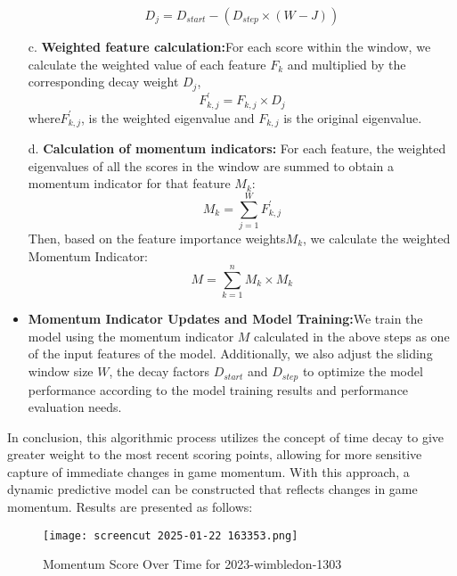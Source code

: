 \documentclass{mcmthesis}
\begin{document}
\begin{itemize}
    \begin{equation} \label{15}
        D_{j}=D_{start}-(D_{step}\times(W-J))
    \end{equation}

    \item[c.]{\bf Weighted feature calculation:}For each score within the window, we calculate the
    weighted value of each feature $F_{k}$ and multiplied by the corresponding decay weight $D_{j}$,
    \begin{equation} \label{16}
        F^{'} _{k,j} =F _{k,j} \times D_{j}
    \end{equation}
    where$F^{'} _{k,j}$, is the weighted eigenvalue and $F_{k,j}$ is the original eigenvalue.
    \item[d.]{\bf Calculation of momentum indicators:} For each feature, the weighted eigenvalues of all
    the scores in the window are summed to obtain a momentum indicator for that feature $M_{k}$:
    \begin{equation} \label{17}
        M_{k}= {\textstyle \sum_{j=1}^{W}F^{'} _{k,j}} 
    \end{equation}
    Then, based on the feature importance weights$ M_{k}$, we calculate the weighted Momentum
    Indicator:
    \begin{equation} \label{18}
        M= {\textstyle \sum_{k=1}^{n}M_{k}\times M_{k}} 
    \end{equation}
    \item {\bf Momentum Indicator Updates and Model Training:}We train the model using the
    momentum indicator $M$ calculated in the above steps as one of the input features of the model. Additionally, we also adjust the sliding window size $W$, the decay factors $D_{start}$ and $D_{step}$ to
    optimize the model performance according to the model training results and performance
    evaluation needs.

\end{itemize}

 In conclusion, this algorithmic process utilizes the concept of time decay to give greater
weight to the most recent scoring points, allowing for more sensitive capture of immediate
changes in game momentum. With this approach, a dynamic predictive model can be
constructed that reflects changes in game momentum. 
Results are presented as follows:

\begin{figure}[htbp]
    \centering
    \texttt{[image: screencut 2025-01-22 163353.png]}
    \caption{Momentum Score Over Time for 2023-wimbledon-1303} \label{Figure 19}
\end{figure}
\end{document}
